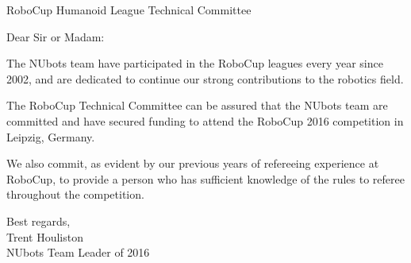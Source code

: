 \documentclass{letter}
\begin{document}
\begin{letter}{RoboCup Humanoid League Technical Committee}
\opening{Dear Sir or Madam:}
The NUbots team have participated in the RoboCup leagues every year since 2002, and are dedicated to continue our strong contributions to the robotics field.

The RoboCup Technical Committee can be assured that the NUbots team are committed and have secured funding to attend the RoboCup 2016 competition in Leipzig, Germany.

We also commit, as evident by our previous years of refereeing experience at RoboCup, to provide a person who has sufficient knowledge of the rules to referee throughout the competition.

Best regards, \\ Trent Houliston \\ NUbots Team Leader of 2016

\end{letter}
\end{document}
